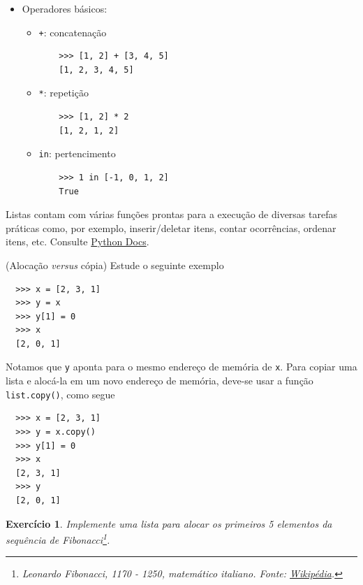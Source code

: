 \documentclass[12pt]{article}
\newtheorem{exr}{Exercício}[section]
\begin{document}
\begin{itemize}
\item Operadores básicos:
  \begin{itemize}
  \item[] \lstinline-+-: concatenação
    \begin{lstlisting}
    >>> [1, 2] + [3, 4, 5]
    [1, 2, 3, 4, 5]
    \end{lstlisting}
  \item[] \lstinline+*+: repetição
    \begin{lstlisting}
    >>> [1, 2] * 2
    [1, 2, 1, 2]
    \end{lstlisting}
  \item[] \lstinline+in+: pertencimento
    \begin{lstlisting}
    >>> 1 in [-1, 0, 1, 2]
    True
    \end{lstlisting}
  \end{itemize}
\end{itemize}

\begin{obs}
  Listas contam com várias funções prontas para a execução de diversas tarefas práticas como, por exemplo, inserir/deletar itens, contar ocorrências, ordenar itens, etc. Consulte \href{https://docs.python.org/3/tutorial/datastructures.html#more-on-lists}{Python Docs}.
\end{obs}

\begin{obs}(Alocação {\it versus} cópia)
  Estude o seguinte exemplo
  \begin{lstlisting}
  >>> x = [2, 3, 1]
  >>> y = x
  >>> y[1] = 0
  >>> x
  [2, 0, 1]
  \end{lstlisting}
  Notamos que \lstinline+y+ aponta para o mesmo endereço de memória de \lstinline+x+. Para copiar uma lista e alocá-la em um novo endereço de memória, deve-se usar a função \lstinline+list.copy()+, como segue
  \begin{lstlisting}
  >>> x = [2, 3, 1]
  >>> y = x.copy()
  >>> y[1] = 0
  >>> x
  [2, 3, 1]
  >>> y
  [2, 0, 1]
  \end{lstlisting}
\end{obs}

\begin{exr}
  Implemente uma lista para alocar os primeiros 5 elementos da sequência de Fibonacci\footnote{Leonardo Fibonacci, 1170 - 1250, matemático italiano. Fonte: \href{https://pt.wikipedia.org/wiki/Leonardo\_Fibonacci}{Wikipédia}.}.
\end{exr}
\end{document}
